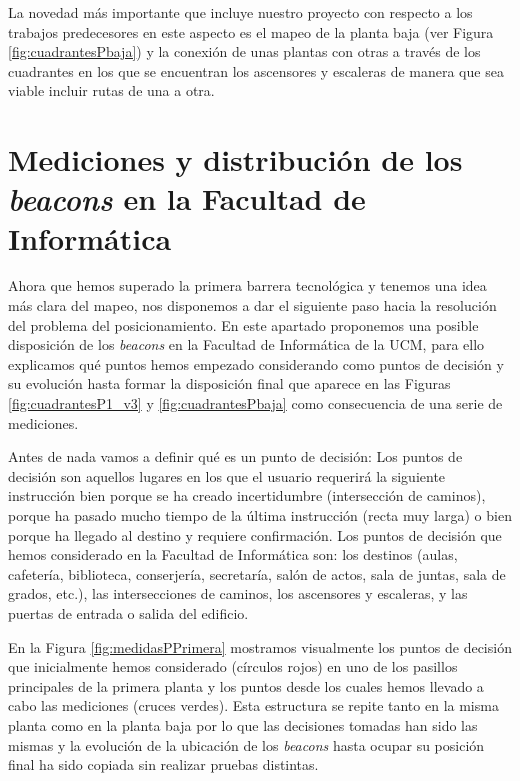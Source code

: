 La novedad más importante que incluye nuestro proyecto con respecto a los trabajos predecesores en este aspecto es el mapeo de la planta baja (ver Figura \ref{fig:cuadrantesPbaja}) y la conexión de unas plantas con otras a través de los cuadrantes en los que se encuentran los ascensores y escaleras de manera que sea viable incluir rutas de una a otra.



\section{Mediciones y distribución de los \textit{beacons} en la Facultad de Informática}
\label{sec:medicionesbeacons}

Ahora que hemos superado la primera barrera tecnológica y tenemos una idea más clara del mapeo, nos disponemos a dar el siguiente paso hacia la resolución del problema del posicionamiento. En este apartado proponemos una posible disposición de los \textit{beacons} en la Facultad de Informática de la UCM, para ello explicamos qué puntos hemos empezado considerando como puntos de decisión y su evolución hasta formar la disposición final que aparece en las Figuras \ref{fig:cuadrantesP1_v3} y \ref{fig:cuadrantesPbaja} como consecuencia de una serie de mediciones.

Antes de nada vamos a definir qué es un punto de decisión: Los puntos de decisión son aquellos lugares en los que el usuario requerirá la siguiente instrucción bien porque se ha creado incertidumbre (intersección de caminos), porque ha pasado mucho tiempo de la última instrucción (recta muy larga) o bien porque ha llegado al destino y requiere confirmación. Los puntos de decisión que hemos considerado en la Facultad de Informática son: los destinos (aulas, cafetería, biblioteca, conserjería, secretaría, salón de actos, sala de juntas, sala de grados, etc.), las intersecciones de caminos, los ascensores y escaleras, y las puertas de entrada o salida del edificio.

En la Figura \ref{fig:medidasPPrimera} mostramos visualmente los puntos de decisión que inicialmente hemos considerado (círculos rojos) en uno de los pasillos principales de la primera planta y los puntos desde los cuales hemos llevado a cabo las mediciones (cruces verdes). Esta estructura se repite tanto en la misma planta como en la planta baja por lo que las decisiones tomadas han sido las mismas y la evolución de la ubicación de los \textit{beacons} hasta ocupar su posición final ha sido copiada sin realizar pruebas distintas.

